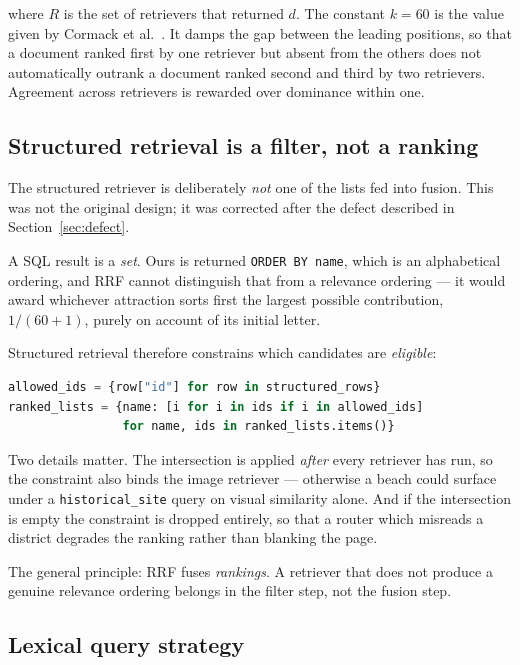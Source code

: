 \documentclass[11pt,a4paper]{article}
\begin{document}
where $R$ is the set of retrievers that returned $d$. The constant $k=60$ is the
value given by Cormack et al.~\cite{rrf}. It damps the gap between the leading
positions, so that a document ranked first by one retriever but absent from the
others does not automatically outrank a document ranked second and third by two
retrievers. Agreement across retrievers is rewarded over dominance within one.

\subsection{Structured retrieval is a filter, not a ranking}
\label{sec:filter-not-rank}

The structured retriever is deliberately \emph{not} one of the lists fed into
fusion. This was not the original design; it was corrected after the defect
described in Section~\ref{sec:defect}.

A SQL result is a \emph{set}. Ours is returned \texttt{ORDER BY name}, which is
an alphabetical ordering, and RRF cannot distinguish that from a relevance
ordering --- it would award whichever attraction sorts first the largest
possible contribution, $1/(60+1)$, purely on account of its initial letter.

Structured retrieval therefore constrains which candidates are \emph{eligible}:

\begin{lstlisting}[language=Python,caption={Structured results applied as an
intersection.}]
allowed_ids = {row["id"] for row in structured_rows}
ranked_lists = {name: [i for i in ids if i in allowed_ids]
                for name, ids in ranked_lists.items()}
\end{lstlisting}

Two details matter. The intersection is applied \emph{after} every retriever has
run, so the constraint also binds the image retriever --- otherwise a beach
could surface under a \texttt{historical\_site} query on visual similarity
alone. And if the intersection is empty the constraint is dropped entirely, so
that a router which misreads a district degrades the ranking rather than
blanking the page.

The general principle: RRF fuses \emph{rankings}. A retriever that does not
produce a genuine relevance ordering belongs in the filter step, not the fusion
step.

\subsection{Lexical query strategy}
\end{document}
